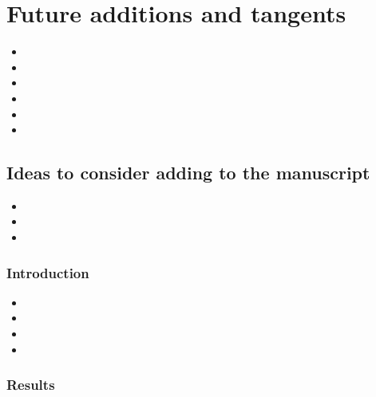 \documentclass[11pt,letterpaper]{article}
\begin{document}
\section{Future additions and tangents}
\label{sec:orgea47b17}



\begin{itemize}
\item 

\item 

\item 

\item 

\item 

\item 
\end{itemize}



\subsection{Ideas to consider adding to the manuscript}
\label{sec:org41166df}



\begin{itemize}
\item 

\item 

\item 
\end{itemize}

\subsubsection{Introduction}
\label{sec:orgc1aaa24}


\begin{itemize}
\item 

\item 

\item 

\item 
\end{itemize}

\subsubsection{Results}
\label{sec:orgb264f0d}
\end{document}
